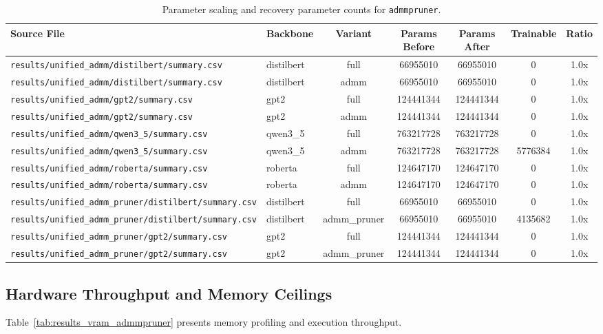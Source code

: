 \begin{table}[t]
\centering
\small
\begin{tabular}{llccccc}
\toprule
\textbf{Source File} & \textbf{Backbone} & \textbf{Variant} & \textbf{Params Before} & \textbf{Params After} & \textbf{Trainable} & \textbf{Ratio} \\
\midrule
\texttt{results/unified\_admm/distilbert/summary.csv} & distilbert & full & 66955010 & 66955010 & 0 & 1.0x \\
\texttt{results/unified\_admm/distilbert/summary.csv} & distilbert & admm & 66955010 & 66955010 & 0 & 1.0x \\
\texttt{results/unified\_admm/gpt2/summary.csv} & gpt2 & full & 124441344 & 124441344 & 0 & 1.0x \\
\texttt{results/unified\_admm/gpt2/summary.csv} & gpt2 & admm & 124441344 & 124441344 & 0 & 1.0x \\
\texttt{results/unified\_admm/qwen3\_5/summary.csv} & qwen3\_5 & full & 763217728 & 763217728 & 0 & 1.0x \\
\texttt{results/unified\_admm/qwen3\_5/summary.csv} & qwen3\_5 & admm & 763217728 & 763217728 & 5776384 & 1.0x \\
\texttt{results/unified\_admm/roberta/summary.csv} & roberta & full & 124647170 & 124647170 & 0 & 1.0x \\
\texttt{results/unified\_admm/roberta/summary.csv} & roberta & admm & 124647170 & 124647170 & 0 & 1.0x \\
\texttt{results/unified\_admm\_pruner/distilbert/summary.csv} & distilbert & full & 66955010 & 66955010 & 0 & 1.0x \\
\texttt{results/unified\_admm\_pruner/distilbert/summary.csv} & distilbert & admm\_pruner & 66955010 & 66955010 & 4135682 & 1.0x \\
\texttt{results/unified\_admm\_pruner/gpt2/summary.csv} & gpt2 & full & 124441344 & 124441344 & 0 & 1.0x \\
\texttt{results/unified\_admm\_pruner/gpt2/summary.csv} & gpt2 & admm\_pruner & 124441344 & 124441344 & 0 & 1.0x \\
\bottomrule
\end{tabular}
\caption{Parameter scaling and recovery parameter counts for \texttt{admmpruner}.}
\label{tab:results_params_admmpruner}
\end{table}

\subsection{Hardware Throughput and Memory Ceilings}
Table~\ref{tab:results_vram_admmpruner} presents memory profiling and execution throughput.

